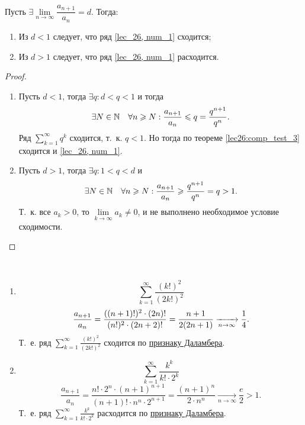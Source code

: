 \documentclass[../../main.tex]{subfiles}
\begin{document}
	\begin{thm}\label{lec27:dalamber}
		
		Пусть $\exists \lim\limits_{n \to \infty} \dfrac{a_{n+1}}{a_n} = d$. Тогда:
		\begin{enumerate}[label={\alph*)}]
		\item Из $d < 1$ следует, что ряд \eqref{lec_26, num_1} сходится;
		\item Из $d > 1$ следует, что ряд \eqref{lec_26, num_1} расходится.
		\end{enumerate}
	\end{thm}
		\begin{proof}
			
			~
			
			\begin{enumerate}[label={\alph*)}]
			\item Пусть $d < 1$, тогда $\exists q : d < q < 1$  и тогда \[\exists N \in \mathbb{N} \quad
			\forall n \geqslant N:
			\frac{a_{n+1}}{a_n} \leqslant q = \frac{q^{n+1}}{q^n}.  \]
			Ряд $\sum\limits_{k=1}^{\infty} q^k$ сходится, т.~к. 
			$q<1$. Но тогда по теореме \ref{lec26:comp_test_3} сходится и \eqref{lec_26, num_1}.
			\item Пусть $d > 1$, тогда $\exists q : 1 < q < d $ и \[\exists N \in \mathbb{N} \quad \forall n 
			\geqslant N:
			\frac{a_{n+1}}{a_n} \geqslant \frac{q^{n+1}}{q^n} = q > 1.  \]
			Т.~к. все $a_k > 0$, то $\lim\limits_{k \to \infty} a_k \neq 0$, и не 
			выполнено необходимое условие сходимости.
			\qedhere
			\end{enumerate}
		\end{proof}
	\begin{examples}

	~

	\begin{enumerate}
	 \item
		\[ \sum_{k = 1}^{\infty} \frac{(k!)^2}{(2k!)^2}    \]
		\[ \frac{a_{n+1}}{a_n} = \frac{((n+1)!)^2 \cdot (2n)!}{(n!)^2 \cdot (2n+2)!} = 
		\frac{n+1}{2(2n+1)}  \xrightarrow[n \rightarrow \infty]{} \frac{1}{4}. \]
		Т.~е. ряд $\sum\limits_{k = 1}^{\infty} \frac{(k!)^2}{(2k!)^2}$ сходится по 
		\hyperref[lec27:dalamber]{признаку Даламбера}.
	\item
		\[  \sum_{k = 1}^{\infty} \frac{k^k}{k! \cdot 2^k} \]
		\[ \frac{a_{n+1}}{a_n} = \frac{n! \cdot 2^n \cdot (n+1)^{n+1}}{(n+1)! \cdot n^n \cdot 
		2^{n+1}} = \frac{(n+1)^{n}}{2\cdot n^n } \underset{n \rightarrow \infty} 
		{\longrightarrow}  \frac{e}{2} > 1. \]
		Т.~е. ряд $\sum\limits_{k = 1}^{\infty} \frac{k^k}{k! \cdot 2^k}$ расходится по 
		\hyperref[lec27:dalamber]{признаку Даламбера}.
	\end{enumerate}
	\end{examples}
\end{document}
